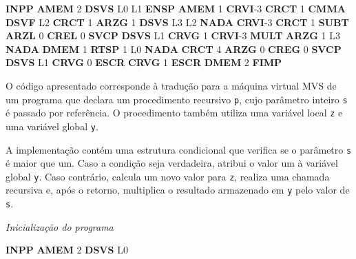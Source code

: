 \documentclass[
  brazilian,
  letterpaper,
]{book}
\newenvironment{Shaded}{\begin{snugshade}}{\end{snugshade}}
\newcommand{\DecValTok}[1]{\textcolor[rgb]{0.68,0.00,0.00}{#1}}
\newcommand{\FunctionTok}[1]{\textcolor[rgb]{0.28,0.35,0.67}{#1}}
\newcommand{\KeywordTok}[1]{\textcolor[rgb]{0.00,0.23,0.31}{\textbf{#1}}}
\newcommand{\NormalTok}[1]{\textcolor[rgb]{0.00,0.23,0.31}{#1}}
\theoremstyle{plain}
\theoremstyle{definition}
\theoremstyle{remark}
\begin{document}
\begin{Shaded}
\begin{Highlighting}[]
    \KeywordTok{INPP}
    \KeywordTok{AMEM}    \DecValTok{2}
    \KeywordTok{DSVS}    \FunctionTok{L0}
\FunctionTok{L1}  \KeywordTok{ENSP}
    \KeywordTok{AMEM}    \DecValTok{1}
    \KeywordTok{CRVI}\NormalTok{    {-}}\DecValTok{3}
    \KeywordTok{CRCT}    \DecValTok{1}
    \KeywordTok{CMMA}
    \KeywordTok{DSVF}    \FunctionTok{L2}
    \KeywordTok{CRCT}    \DecValTok{1}
    \KeywordTok{ARZG}    \DecValTok{1}
    \KeywordTok{DSVS}    \FunctionTok{L3}
\FunctionTok{L2}  \KeywordTok{NADA}
    \KeywordTok{CRVI}\NormalTok{    {-}}\DecValTok{3}
    \KeywordTok{CRCT}    \DecValTok{1}
    \KeywordTok{SUBT}
    \KeywordTok{ARZL}    \DecValTok{0}
    \KeywordTok{CREL}    \DecValTok{0}
    \KeywordTok{SVCP}
    \KeywordTok{DSVS}    \FunctionTok{L1}
    \KeywordTok{CRVG}    \DecValTok{1}
    \KeywordTok{CRVI}\NormalTok{    {-}}\DecValTok{3}
    \KeywordTok{MULT}
    \KeywordTok{ARZG}    \DecValTok{1}
\FunctionTok{L3}  \KeywordTok{NADA}
    \KeywordTok{DMEM}    \DecValTok{1}
    \KeywordTok{RTSP}    \DecValTok{1}
\FunctionTok{L0}  \KeywordTok{NADA}
    \KeywordTok{CRCT}    \DecValTok{4}
    \KeywordTok{ARZG}    \DecValTok{0}
    \KeywordTok{CREG}    \DecValTok{0}
    \KeywordTok{SVCP}
    \KeywordTok{DSVS}    \FunctionTok{L1}
    \KeywordTok{CRVG}    \DecValTok{0}
    \KeywordTok{ESCR}
    \KeywordTok{CRVG}    \DecValTok{1}
    \KeywordTok{ESCR}
    \KeywordTok{DMEM}    \DecValTok{2}
    \KeywordTok{FIMP}
\end{Highlighting}
\end{Shaded}

O código apresentado corresponde à tradução para a máquina virtual MVS
de um programa que declara um procedimento recursivo \texttt{p}, cujo
parâmetro inteiro \texttt{s} é passado por referência. O procedimento
também utiliza uma variável local \texttt{z} e uma variável global
\texttt{y}.

A implementação contém uma estrutura condicional que verifica se o
parâmetro \texttt{s} é maior que um. Caso a condição seja verdadeira,
atribui o valor um à variável global \texttt{y}. Caso contrário, calcula
um novo valor para \texttt{z}, realiza uma chamada recursiva e, após o
retorno, multiplica o resultado armazenado em \texttt{y} pelo valor de
\texttt{s}.

\emph{Inicialização do programa}

\begin{Shaded}
\begin{Highlighting}[]
    \KeywordTok{INPP}
    \KeywordTok{AMEM}    \DecValTok{2}
    \KeywordTok{DSVS}    \FunctionTok{L0}
\end{Highlighting}
\end{Shaded}
\end{document}
